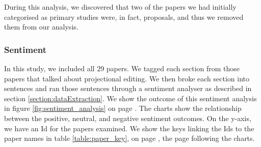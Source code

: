 \begin{figure}[h]
    \centering
\end{figure}

During this analysis, we discovered that two of the papers we had initially categorised as primary studies were, in fact, proposals, and thus we removed them from our analysis.

\subsubsection{Sentiment}

In this study, we included all 29 papers.
We tagged each section from those papers that talked about projectional editing.
We then broke each section into sentences and ran those sentences through a sentiment analyser as described in section \ref{section:dataExtraction}.
We show the outcome of this sentiment analysis in figure \ref{fig:sentiment_analysis} on page \pageref{fig:sentiment_analysis}. 
The charts show the relationship between the positive, neutral, and negative sentiment outcomes.
On the y-axis, we have an Id for the papers examined. 
We show the keys linking the Ids to the paper names in table \ref{table:paper_key}, on page \pageref{table:paper_key}, the page following the charts.

